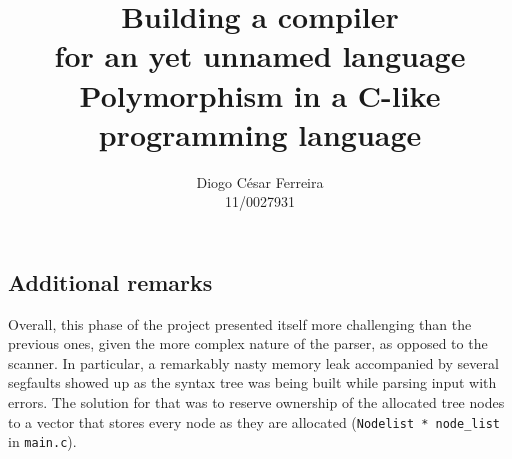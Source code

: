 \documentclass[12pt]{article}
\begin{document}
\title{Building a compiler\\\Large for an yet unnamed language\\\small Polymorphism in a C-like programming language}
\author{Diogo César Ferreira\\11/0027931}
\maketitle

 
 
 
 
 
\clearpage







\subsection{Additional remarks}
Overall, this phase of the project presented itself more challenging than the previous ones,
given the more complex nature of the parser, as opposed to the scanner. In particular, a
remarkably nasty memory leak accompanied by several segfaults showed up as the
syntax tree was being built while parsing input with errors. The solution for that was to
reserve ownership of the allocated tree nodes to a vector that stores every node as they
are allocated (\texttt{Nodelist * node\_list} in \texttt{main.c}).

\printbibliography
\end{document}
